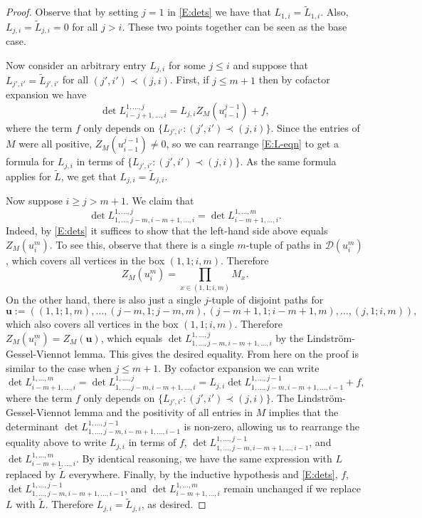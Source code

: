 \documentclass[aop, preprint]{imsart}
\theoremstyle{plain}
\theoremstyle{definition}
\theoremstyle{plain}
\newcommand{\bu}{\mathbf{u}}
\begin{document}
\begin{proof}
Observe that by setting $j=1$ in \eqref{E:dets} we have that $L_{1, i} = \tilde L_{1, i}$. Also, $L_{j, i} = \tilde L_{j, i} = 0$ for all $j > i$. These two points together can be seen as the base case.

Now consider an arbitrary entry $L_{j, i}$ for some $j \le i$ and suppose that $L_{j', i'} = \tilde L_{j',i'}$ for all $(j', i') \prec (j, i)$. First, if $j \le m + 1$ then by cofactor expansion we have
\begin{equation}
	\label{E:L-eqn}
	\det L^{1, \dots, j}_{i - j +1, \dots, i} = L_{j, i} Z_M(u_{i-1}^{j-1}) + f,
\end{equation}
where the term $f$ only depends on $\{L_{j', i'} : (j', i') \prec (j, i)\}$. Since the entries of $M$ were all positive, $Z_M(u_{i-1}^{j-1}) \ne 0$, so we can rearrange \eqref{E:L-eqn} to get a formula for $L_{j, i}$ in terms of $\{L_{j', i'} : (j', i') \prec (j, i)\}$. As the same formula applies for $\tilde L$, we get that $L_{j, i} = \tilde L_{j, i}$.

Now suppose $i \ge j > m + 1$. We claim that 
$$
\det L^{1, \dots, j}_{1, \dots, j - m, i - m + 1, \dots, i} = \det L^{1, \dots, m}_{i - m + 1, \dots, i}.
$$
Indeed, by \eqref{E:dets} it suffices to show that the left-hand side above equals $Z_M(u^m_i)$. To see this, observe that there is a single $m$-tuple of paths in $\mathcal D(u^m_i)$, which covers all vertices in the box $(1, 1; i, m)$. Therefore 
$$
Z_M(u^m_i) = \prod_{x \in (1, 1; i, m)} M_x.
$$
On the other hand, there is also just a single $j$-tuple of disjoint paths for
$$
\bu := ((1, 1; 1, m), \dots, (j-m, 1; j- m, m), (j- m + 1, 1; i - m + 1, m), \dots, (j, 1; i, m)),
$$
which also covers all vertices in the box $(1, 1; i, m)$. Therefore $Z_M(u^m_i) = Z_M(\bu)$, which equals $\det L^{1, \dots, j}_{1, \dots, j - m, i - m + 1, \dots, i}$ by the Lindstr\"om-Gessel-Viennot lemma. This gives the desired equality. From here on the proof is similar to the case when $j \le m + 1$. By cofactor expansion we can write
$$
\det L^{1, \dots, m}_{i - m + 1, \dots, i} = \det L^{1, \dots, j}_{1, \dots, j - m, i - m + 1, \dots, i} = L_{j,i} \det L^{1, \dots, j-1}_{1, \dots, j - m, i - m + 1, \dots, i-1} + f,
$$
where the term $f$ only depends on $\{L_{j', i'} : (j', i') \prec (j, i)\}$. The Lindstr\"om-Gessel-Viennot lemma and the positivity of all entries in $M$ implies that the determinant $\det L^{1, \dots, j-1}_{1, \dots, j - m, i - m + 1, \dots, i-1}$ is non-zero, allowing us to rearrange the equality above to write $L_{j, i}$ in terms of $f$, $\det L^{1, \dots, j-1}_{1, \dots, j - m, i - m + 1, \dots, i-1}$, and $\det L^{1, \dots, m}_{i - m + 1, \dots, i}$. By identical reasoning, we have the same expression with $L$ replaced by $\tilde L$ everywhere. Finally, by the inductive hypothesis and \eqref{E:dets}, $f$, $\det L^{1, \dots, j-1}_{1, \dots, j - m, i - m + 1, \dots, i-1}$, and $\det L^{1, \dots, m}_{i - m + 1, \dots, i}$ remain unchanged if we replace $L$ with $\tilde L$. Therefore $L_{j, i} = \tilde L_{j, i}$, as desired. 
 

\end{proof}
\end{document}
